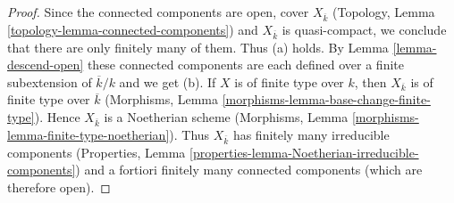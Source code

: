 \documentclass[10pt,a4paper]{amsart}
\theoremstyle{plain}
\theoremstyle{definition}
\theoremstyle{remark}
\numberwithin{equation}{subsection}
\begin{document}
\begin{proof}
Since the connected components are open, cover $X_{\overline{k}}$
(Topology, Lemma \ref{topology-lemma-connected-components}) and
$X_{\overline{k}}$ is quasi-compact, we conclude that there are only
finitely many of them. Thus (a) holds.
By Lemma \ref{lemma-descend-open} these connected components
are each defined over a finite subextension of $\overline{k}/k$
and we get (b).
If $X$ is of finite type over $k$, then $X_{\overline{k}}$ is of finite
type over $\overline{k}$
(Morphisms, Lemma \ref{morphisms-lemma-base-change-finite-type}).
Hence $X_{\overline{k}}$ is a Noetherian scheme
(Morphisms, Lemma \ref{morphisms-lemma-finite-type-noetherian}).
Thus $X_{\overline{k}}$ has finitely many irreducible components
(Properties, Lemma \ref{properties-lemma-Noetherian-irreducible-components})
and a fortiori finitely many connected components (which are
therefore open).
\end{proof}
\end{document}
